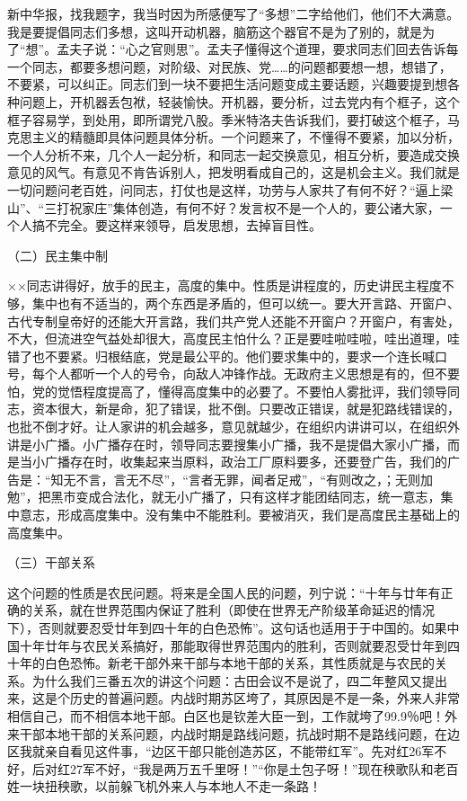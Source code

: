 新中华报，找我题字，我当时因为所感便写了“多想”二字给他们，他们不大满意。我是要提倡同志们多想，这叫开动机器，脑筋这个器官不是为了别的，就是为了“想”。孟夫子说：“心之官则思”。孟夫子懂得这个道理，要求同志们回去告诉每一个同志，都要多想问题，对阶级、对民族、党……的问题都要想一想，想错了，不要紧，可以纠正。同志们到一块不要把生活问题变成主要话题，兴趣要提到想各种问题上，开机器丢包袱，轻装愉快。开机器，要分析，过去党内有个框子，这个框子容易学，到处用，即所谓党八股。季米特洛夫告诉我们，要打破这个框子，马克思主义的精髓即具体问题具体分析。一个问题来了，不懂得不要紧，加以分析，一个人分析不来，几个人一起分析，和同志一起交换意见，相互分析，要造成交换意见的风气。有意见不肯告诉别人，把发明看成自己的，这是机会主义。我们就是一切问题问老百姓，问同志，打仗也是这样，功劳与人家共了有何不好？“逼上梁山”、“三打祝家庄”集体创造，有何不好？发言权不是一个人的，要公诸大家，一个人搞不完全。要这样来领导，启发思想，去掉盲目性。

（二）民主集中制

××同志讲得好，放手的民主，高度的集中。性质是讲程度的，历史讲民主程度不够，集中也有不适当的，两个东西是矛盾的，但可以统一。要大开言路、开窗户、古代专制皇帝好的还能大开言路，我们共产党人还能不开窗户？开窗户，有害处，不大，但流进空气益处却很大，高度民主怕什么？正是要哇啦哇啦，哇出道理，哇错了也不要紧。归根结底，党是最公平的。他们要求集中的，要求一个连长喊口号，每个人都听一个人的号令，向敌人冲锋作战。无政府主义思想是有的，但不要怕，党的觉悟程度提高了，懂得高度集中的必要了。不要怕人雾批评，我们领导同志，资本很大，新是命，犯了错误，批不倒。只要改正错误，就是犯路线错误的，也批不倒才好。让人家讲的机会越多，意见就越少，在组织内讲讲可以，在组织外讲是小广播。小广播存在时，领导同志要搜集小广播，我不是提倡大家小广播，而是当小广播存在时，收集起来当原料，政治工厂原料要多，还要登广告，我们的广告是：“知无不言，言无不尽”，“言者无罪，闻者足戒”，“有则改之，；无则加勉”，把黑市变成合法化，就无小广播了，只有这样才能团结同志，统一意志，集中意志，形成高度集中。没有集中不能胜利。要被消灭，我们是高度民主基础上的高度集中。

（三）干部关系

这个问题的性质是农民问题。将来是全国人民的问题，列宁说：“十年与廿年有正确的关系，就在世界范围内保证了胜利（即使在世界无产阶级革命延迟的情况下），否则就要忍受廿年到四十年的白色恐怖”。这句话也适用于于中国的。如果中国十年廿年与农民关系搞好，那能取得世界范围内的胜利，否则就要忍受廿年到四十年的白色恐怖。新老干部外来干部与本地干部的关系，其性质就是与农民的关系。为什么我们三番五次的讲这个问题：古田会议不是说了，四二年整风又提出来，这是个历史的普遍问题。内战时期苏区垮了，其原因是不是一条，外来人非常相信自己，而不相信本地干部。白区也是钦差大臣一到，工作就垮了99.9％吧！外来干部本地干部的关系问题，内战时期是路线问题，抗战时期不是路线问题，在边区我就亲自看见这件事，“边区干部只能创造苏区，不能带红军”。先对红26军不好，后对红27军不好，“我是两万五千里呀！”“你是土包子呀！”现在秧歌队和老百姓一块扭秧歌，以前躲飞机外来人与本地人不走一条路！

